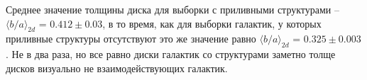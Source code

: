 Среднее значение толщины диска для выборки с приливными структурами -- $\langle b/a \rangle_{2d}$ = $0.412 \pm 0.03$, в то время, как для выборки галактик, у которых приливные структуры отсутствуют это же значение равно  $\langle b/a \rangle_{2d}$ = $0.325 \pm 0.003$. Не в два раза, но все равно диски галактик со структурами заметно толще дисков визуально не взаимодействующих галактик.
